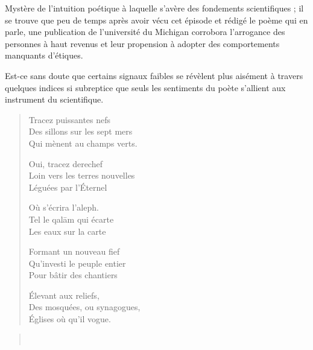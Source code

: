 \begin{prose}

Mystère de l’intuition poétique à laquelle s’avère des fondements scientifiques ; il se trouve que peu de temps après avoir vécu cet épisode et rédigé le poème qui en parle, une publication de l’université du Michigan corrobora l’arrogance des personnes à haut revenus et leur propension à adopter des comportements manquants d’étiques.

Est-ce sans doute que certains signaux faibles se révèlent plus aisément à travers quelques indices si subreptice que seuls les sentiments du poète s’allient aux instrument du scientifique.
\end{prose}

\begin{verse}
Tracez puissantes nefs\\
Des sillons sur les sept mers\\
Qui mènent au champs verts.

Oui, tracez derechef\\
Loin vers les terres  nouvelles\\
Léguées par l’Éternel

Où s’écrira l’aleph.\\
Tel le qalām qui écarte\\
Les eaux sur la carte

Formant un nouveau fief\\
Qu’investi le peuple entier\\
Pour bâtir des chantiers

Élevant aux reliefs,\\
Des mosquées, ou synagogues,\\
Églises où qu’il vogue.
\end{verse}

\begin{verse}
	\\
\end{verse}


